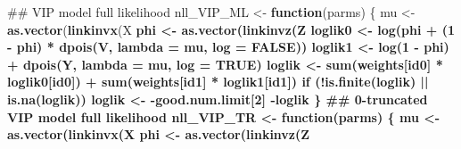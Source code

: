 \documentclass[]{article}
\newenvironment{Shaded}{\begin{snugshade}}{\end{snugshade}}
\newcommand{\KeywordTok}[1]{\textcolor[rgb]{0.13,0.29,0.53}{\textbf{#1}}}
\newcommand{\DataTypeTok}[1]{\textcolor[rgb]{0.13,0.29,0.53}{#1}}
\newcommand{\DecValTok}[1]{\textcolor[rgb]{0.00,0.00,0.81}{#1}}
\newcommand{\StringTok}[1]{\textcolor[rgb]{0.31,0.60,0.02}{#1}}
\newcommand{\OtherTok}[1]{\textcolor[rgb]{0.56,0.35,0.01}{#1}}
\newcommand{\ControlFlowTok}[1]{\textcolor[rgb]{0.13,0.29,0.53}{\textbf{#1}}}
\newcommand{\OperatorTok}[1]{\textcolor[rgb]{0.81,0.36,0.00}{\textbf{#1}}}
\newcommand{\NormalTok}[1]{#1}
\begin{document}
\begin{Shaded}
\begin{Highlighting}[]
\NormalTok{    ## VIP model full likelihood}
\NormalTok{    nll_VIP_ML <-}\StringTok{ }\ControlFlowTok{function}\NormalTok{(parms) \{}
\NormalTok{        mu <-}\StringTok{ }\KeywordTok{as.vector}\NormalTok{(}\KeywordTok{linkinvx}\NormalTok{(X }\OperatorTok{%
\NormalTok{        phi <-}\StringTok{ }\KeywordTok{as.vector}\NormalTok{(}\KeywordTok{linkinvz}\NormalTok{(Z }\OperatorTok{%
\NormalTok{        loglik0 <-}\StringTok{ }\KeywordTok{log}\NormalTok{(phi }\OperatorTok{+}\StringTok{ }\NormalTok{(}\DecValTok{1} \OperatorTok{-}\StringTok{ }\NormalTok{phi) }\OperatorTok{*}\StringTok{ }\KeywordTok{dpois}\NormalTok{(V, }\DataTypeTok{lambda =}\NormalTok{ mu, }\DataTypeTok{log =} \OtherTok{FALSE}\NormalTok{))}
\NormalTok{        loglik1 <-}\StringTok{ }\KeywordTok{log}\NormalTok{(}\DecValTok{1} \OperatorTok{-}\StringTok{ }\NormalTok{phi) }\OperatorTok{+}\StringTok{ }\KeywordTok{dpois}\NormalTok{(Y, }\DataTypeTok{lambda =}\NormalTok{ mu, }\DataTypeTok{log =} \OtherTok{TRUE}\NormalTok{)}
\NormalTok{        loglik <-}\StringTok{ }\KeywordTok{sum}\NormalTok{(weights[id0] }\OperatorTok{*}\StringTok{ }\NormalTok{loglik0[id0]) }\OperatorTok{+}\StringTok{ }\KeywordTok{sum}\NormalTok{(weights[id1] }\OperatorTok{*}\StringTok{ }\NormalTok{loglik1[id1])}
        \ControlFlowTok{if}\NormalTok{ (}\OperatorTok{!}\KeywordTok{is.finite}\NormalTok{(loglik) }\OperatorTok{||}\StringTok{ }\KeywordTok{is.na}\NormalTok{(loglik))}
\NormalTok{            loglik <-}\StringTok{ }\OperatorTok{-}\NormalTok{good.num.limit[}\DecValTok{2}\NormalTok{]}
        \OperatorTok{-}\NormalTok{loglik}
\NormalTok{    \}}
\NormalTok{    ## 0-truncated VIP model full likelihood}
\NormalTok{    nll_VIP_TR <-}\StringTok{ }\ControlFlowTok{function}\NormalTok{(parms) \{}
\NormalTok{        mu <-}\StringTok{ }\KeywordTok{as.vector}\NormalTok{(}\KeywordTok{linkinvx}\NormalTok{(X }\OperatorTok{%
\NormalTok{        phi <-}\StringTok{ }\KeywordTok{as.vector}\NormalTok{(}\KeywordTok{linkinvz}\NormalTok{(Z }\OperatorTok{%
}}}}
\end{Highlighting}
\end{Shaded}
\end{document}
